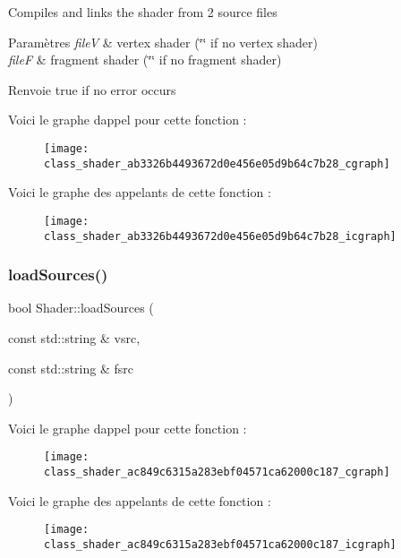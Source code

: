 Compiles and links the shader from 2 source files 
\begin{DoxyParams}{Paramètres}
{\em fileV} & vertex shader (\char`\"{}\char`\"{} if no vertex shader) \\
\hline
{\em fileF} & fragment shader (\char`\"{}\char`\"{} if no fragment shader) \\
\hline
\end{DoxyParams}
\begin{DoxyReturn}{Renvoie}
true if no error occurs 
\end{DoxyReturn}
Voici le graphe d\textquotesingle{}appel pour cette fonction \+:\nopagebreak
\begin{figure}[H]
\begin{center}
\leavevmode
\texttt{[image: class\_shader\_ab3326b4493672d0e456e05d9b64c7b28\_cgraph]}
\end{center}
\end{figure}
Voici le graphe des appelants de cette fonction \+:\nopagebreak
\begin{figure}[H]
\begin{center}
\leavevmode
\texttt{[image: class\_shader\_ab3326b4493672d0e456e05d9b64c7b28\_icgraph]}
\end{center}
\end{figure}
\mbox{\label{class_shader_ac849c6315a283ebf04571ca62000c187}} 
\subsubsection{\texorpdfstring{load\+Sources()}{loadSources()}}
{\footnotesize\ttfamily bool Shader\+::load\+Sources (\begin{DoxyParamCaption}\item[{const std\+::string \&}]{vsrc,  }\item[{const std\+::string \&}]{fsrc }\end{DoxyParamCaption})}

Voici le graphe d\textquotesingle{}appel pour cette fonction \+:\nopagebreak
\begin{figure}[H]
\begin{center}
\leavevmode
\texttt{[image: class\_shader\_ac849c6315a283ebf04571ca62000c187\_cgraph]}
\end{center}
\end{figure}
Voici le graphe des appelants de cette fonction \+:\nopagebreak
\begin{figure}[H]
\begin{center}
\leavevmode
\texttt{[image: class\_shader\_ac849c6315a283ebf04571ca62000c187\_icgraph]}
\end{center}
\end{figure}
\mbox{\label{class_shader_ab46602912ae536c070edf4720a254c31}} 
